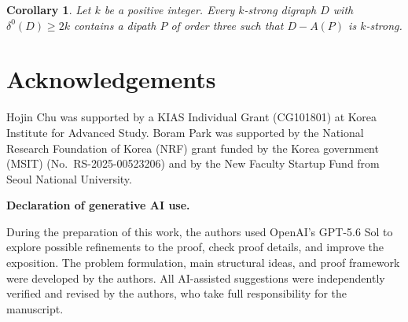 \documentclass[12pt]{article}
\numberwithin{equation}{section}
\theoremstyle{plain}
\newtheorem{corollary}[theorem]{Corollary}
\theoremstyle{definition}
\begin{document}
\begin{corollary}\label{cor:arc-deletion-order-three}
Let $k$ be a positive integer.
Every $k$-strong digraph $D$ with $\delta^0(D)\ge2k$ contains a dipath $P$ of order three such that $D-A(P)$ is $k$-strong.
\end{corollary}






\section*{Acknowledgements}

Hojin Chu was supported by a KIAS Individual Grant (CG101801) at Korea Institute for Advanced Study.
Boram Park was supported by the National Research Foundation of Korea (NRF) grant funded by the Korea government (MSIT) (No.~RS-2025-00523206) and by the New Faculty Startup Fund from Seoul National University.

\bigskip
\noindent\textbf{Declaration of generative AI use.}
\par\smallskip
\noindent 
During the preparation of this work, the authors used OpenAI's GPT-5.6 Sol to explore possible refinements to the proof, check proof details, and improve the exposition.
The problem formulation, main structural ideas, and proof framework were developed by the authors.
All AI-assisted suggestions were independently verified and revised by the authors, who take full responsibility for the manuscript.
\end{document}
